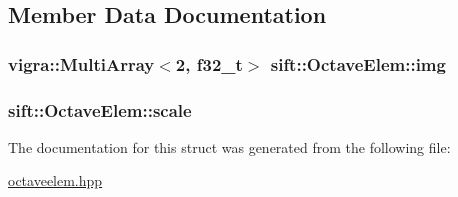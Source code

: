 \subsection{Member Data Documentation}
\hypertarget{structsift_1_1OctaveElem_adb650aac85f74b82a5d3ea1d5a8e66e2}{}
\subsubsection[{img}]{\setlength{\rightskip}{0pt plus 5cm}vigra\+::\+Multi\+Array$<$2, {\bf f32\+\_\+t}$>$ sift\+::\+Octave\+Elem\+::img}\label{structsift_1_1OctaveElem_adb650aac85f74b82a5d3ea1d5a8e66e2}
\hypertarget{structsift_1_1OctaveElem_a20c52ec14f807ff469e3602dfb79cb88}{}
\subsubsection[{scale}]{ sift\+::\+Octave\+Elem\+::scale}\label{structsift_1_1OctaveElem_a20c52ec14f807ff469e3602dfb79cb88}


The documentation for this struct was generated from the following file\+:\begin{DoxyCompactItemize}
\item 
\hyperlink{octaveelem_8hpp}{octaveelem.\+hpp}\end{DoxyCompactItemize}
